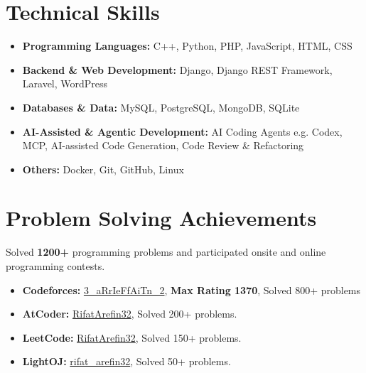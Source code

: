 \documentclass[letterpaper,11pt]{article}
\newcommand{\resumeItemListStart}{\begin{itemize}[leftmargin=0.15in]}
\newcommand{\resumeItemListEnd}{\end{itemize}}
\newcommand{\resumeItem}[1]{\item {#1}}
\begin{document}
\section{Technical Skills}
\resumeItemListStart
    \resumeItem{\textbf{Programming Languages: }C++, Python, PHP, JavaScript, HTML, CSS}
    \vspace{-6pt}
    \resumeItem{\textbf{Backend \& Web Development: }Django, Django REST Framework, Laravel, WordPress}
    \vspace{-6pt}
    \resumeItem{\textbf{Databases \& Data: }MySQL, PostgreSQL, MongoDB, SQLite}
    \vspace{-6pt}
    \resumeItem{\textbf{AI-Assisted \& Agentic Development: }AI Coding Agents e.g. Codex, MCP, AI-assisted Code Generation, Code Review \& Refactoring}
    \vspace{-6pt}
    \resumeItem{\textbf{Others: }Docker, Git, GitHub, Linux}
\resumeItemListEnd

\section{Problem Solving Achievements}
\justify
Solved \textbf{1200+} programming problems and participated onsite and online programming contests.
\vspace{-5pt}
\resumeItemListStart
    \resumeItem{\textbf{Codeforces:} \textcolor{urlcolor}{\href{https://codeforces.com/profile/3_aRrIeFfAiTn_2}{3\_aRrIeFfAiTn\_2}}, \textbf{Max Rating 1370}, Solved 800+ problems}
    \vspace{-6pt}
    \resumeItem{\textbf{AtCoder:} \textcolor{urlcolor}{\href{https://atcoder.jp/users/RifatArefin32}{RifatArefin32}}, Solved 200+ problems.}
    \vspace{-6pt}
    \resumeItem{\textbf{LeetCode:} \textcolor{urlcolor}{\href{https://leetcode.com/RifatArefin32/}{RifatArefin32}}, Solved 150+ problems.}
    \vspace{-6pt}
    \resumeItem{\textbf{LightOJ:} \textcolor{urlcolor}{\href{https://lightoj.com/user/rifat_arefin32}{rifat\_arefin32}}, Solved 50+ problems.}
\resumeItemListEnd
\end{document}
